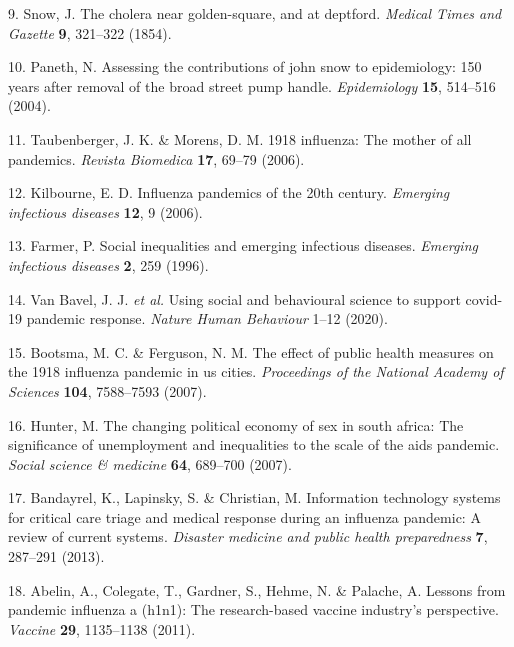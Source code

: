 \documentclass[]{article}
\begin{document}
\begin{cslreferences}
\leavevmode\hypertarget{ref-snow1854cholera}{}%
9. Snow, J. The cholera near golden-square, and at deptford. \emph{Medical Times and Gazette} \textbf{9}, 321--322 (1854).

\leavevmode\hypertarget{ref-paneth2004assessing}{}%
10. Paneth, N. Assessing the contributions of john snow to epidemiology: 150 years after removal of the broad street pump handle. \emph{Epidemiology} \textbf{15}, 514--516 (2004).

\leavevmode\hypertarget{ref-taubenberger20061918}{}%
11. Taubenberger, J. K. \& Morens, D. M. 1918 influenza: The mother of all pandemics. \emph{Revista Biomedica} \textbf{17}, 69--79 (2006).

\leavevmode\hypertarget{ref-kilbourne2006influenza}{}%
12. Kilbourne, E. D. Influenza pandemics of the 20th century. \emph{Emerging infectious diseases} \textbf{12}, 9 (2006).

\leavevmode\hypertarget{ref-farmer1996social}{}%
13. Farmer, P. Social inequalities and emerging infectious diseases. \emph{Emerging infectious diseases} \textbf{2}, 259 (1996).

\leavevmode\hypertarget{ref-van2020using}{}%
14. Van Bavel, J. J. \emph{et al.} Using social and behavioural science to support covid-19 pandemic response. \emph{Nature Human Behaviour} 1--12 (2020).

\leavevmode\hypertarget{ref-bootsma2007effect}{}%
15. Bootsma, M. C. \& Ferguson, N. M. The effect of public health measures on the 1918 influenza pandemic in us cities. \emph{Proceedings of the National Academy of Sciences} \textbf{104}, 7588--7593 (2007).

\leavevmode\hypertarget{ref-hunter2007changing}{}%
16. Hunter, M. The changing political economy of sex in south africa: The significance of unemployment and inequalities to the scale of the aids pandemic. \emph{Social science \& medicine} \textbf{64}, 689--700 (2007).

\leavevmode\hypertarget{ref-bandayrel2013information}{}%
17. Bandayrel, K., Lapinsky, S. \& Christian, M. Information technology systems for critical care triage and medical response during an influenza pandemic: A review of current systems. \emph{Disaster medicine and public health preparedness} \textbf{7}, 287--291 (2013).

\leavevmode\hypertarget{ref-abelin2011lessons}{}%
18. Abelin, A., Colegate, T., Gardner, S., Hehme, N. \& Palache, A. Lessons from pandemic influenza a (h1n1): The research-based vaccine industry's perspective. \emph{Vaccine} \textbf{29}, 1135--1138 (2011).


\end{cslreferences}
\end{document}
